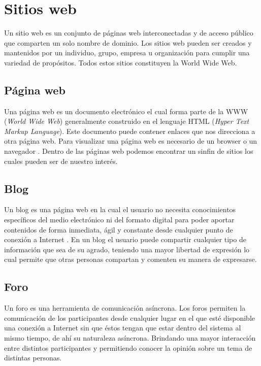 

\section{Sitios web}
Un sitio web \citep{CT15} es un conjunto de páginas web interconectadas y de acceso público que comparten 
un solo nombre de dominio. Los sitios web pueden ser creados y mantenidos por un individuo, grupo, empresa 
u organización para cumplir una variedad de propósitos. Todos estos sitios constituyen la World Wide Web. 

\subsection{Página web}
Una página web es un documento electrónico el cual forma parte de la WWW (\textit{World Wide Web}) generalmente 
construido en el lenguaje HTML (\textit{Hyper Text Markup Language}). Este documento puede contener enlaces que nos 
direcciona a otra página web. Para visualizar una página web es necesario de un browser o un navegador \citep{CT16}. 
Dentro de las páginas web podemos encontrar un sinfin de sitios los cuales pueden ser de nuestro interés.

\subsection{Blog}
Un blog es una página web en la cual el usuario no necesita conocimientos específicos del medio electrónico ni del 
formato digital para poder aportar contenidos de forma inmediata, ágil y constante desde cualquier punto de conexión 
a Internet \citep{CT17}. En un blog el usuario puede compartir cualquier tipo de información que sea de su agrado, 
teniendo una mayor libertad de expresión lo cual permite que otras personas compartan y comenten su manera de expresarse.

\subsection{Foro}
Un foro es una herramienta de comunicación asíncrona. Los foros permiten la comunicación de los participantes desde 
cualquier lugar en el que  esté  disponible  una  conexión  a Internet  sin  que  éstos  tengan  que  estar dentro del 
sistema al mismo tiempo, de ahí su naturaleza asíncrona. Brindando una mayor interacción entre distintos 
participantes y permitiendo conocer la opinión sobre un tema de distintas personas.


